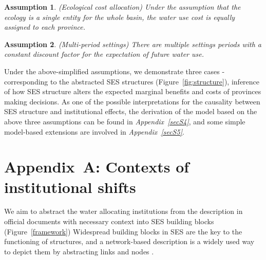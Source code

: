 \documentclass[default, sn-standardnature]{sn-jnl}
\newtheorem{ass}{Assumption}
\begin{document}
\begin{ass}
    (Ecological cost allocation) Under the assumption that the ecology is a single entity for the whole basin, the water use cost is equally assigned to each province.
\end{ass}

\begin{ass}
    (Multi-period settings) There are multiple settings periods with a constant discount factor for the expectation of future water use.
\end{ass}

Under the above-simplified assumptions, we demonstrate three cases -corresponding to the abstracted SES structures (Figure~\ref{fig:structure}), inference of how SES structure alters the expected marginal benefits and costs of provinces making decisions.
As one of the possible interpretations for the causality between SES structure and institutional effects, the derivation of the model based on the above three assumptions can be found in \textit{Appendix~\ref{secS4}}, and some simple model-based extensions are involved in \textit{Appendix~\ref{secS5}}.




\label{bib}

\newpage
\appendix
\label{appendix}
\renewcommand{\figurename}{Supplementary Figure}
\renewcommand{\appendixname}{Appendix~\Alph{section}}
\setcounter{section}{0}

\section{Appendix~A: Contexts of institutional shifts}\label{secS1}
\renewcommand{\thefigure}{A\arabic{figure}}
\renewcommand{\thetable}{A\arabic{table}}
\setcounter{figure}{0}
\setcounter{table}{0}

We aim to abstract the water allocating institutions from the description in official documents with necessary context into SES building blocks (Figure~\ref{framework})
Widespread building blocks in SES are the key to the functioning of structures, and a network-based description is a widely used way to depict them by abstracting links and nodes \cite{bodin2017a,kluger2020,guerrero2015}.
\end{document}
